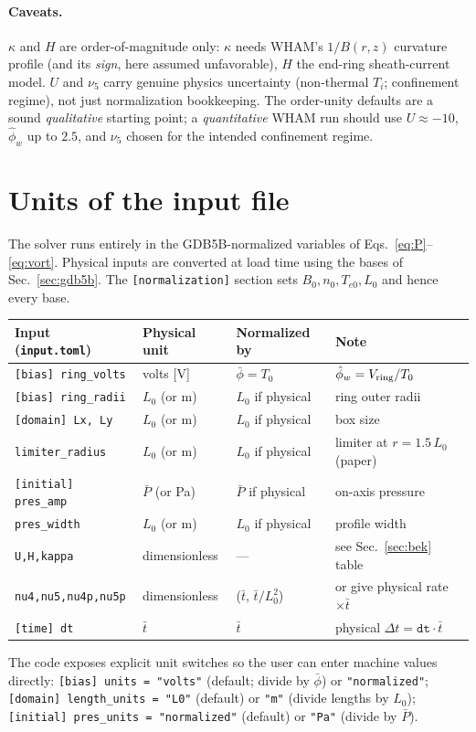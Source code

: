 \documentclass[11pt]{article}
\begin{document}
\paragraph{Caveats.} $\kappa$ and $H$ are order-of-magnitude only: $\kappa$ needs
WHAM's $1/B(r,z)$ curvature profile (and its \emph{sign}, here assumed unfavorable),
$H$ the end-ring sheath-current model. $U$ and $\nu_5$ carry genuine physics
uncertainty (non-thermal $T_i$; confinement regime), not just normalization
bookkeeping. The order-unity defaults are a sound \emph{qualitative} starting
point; a \emph{quantitative} WHAM run should use $U\approx-10$, $\hat\phi_w$ up to
$2.5$, and $\nu_5$ chosen for the intended confinement regime.

\section{Units of the input file}
\label{sec:units}

The solver runs entirely in the GDB5B-normalized variables of
Eqs.~\eqref{eq:P}--\eqref{eq:vort}. Physical inputs are converted at load time
using the bases of Sec.~\ref{sec:gdb5b}. The \texttt{[normalization]} section
sets $B_0,n_0,T_{e0},L_0$ and hence every base.
\begin{center}
\begin{tabular}{p{3.4cm} p{2.6cm} p{3.0cm} p{4.5cm}}
\toprule
Input (\texttt{input.toml}) & Physical unit & Normalized by & Note\\
\midrule
\texttt{[bias] ring\_volts}   & volts [\si{V}]        & $\bar\phi=T_0$        & $\hat\phi_w = V_{\rm ring}/T_0$\\
\texttt{[bias] ring\_radii}   & $L_0$ (or \si{m})     & $L_0$ if physical     & ring outer radii\\
\texttt{[domain] Lx, Ly}      & $L_0$ (or \si{m})     & $L_0$ if physical     & box size\\
\texttt{limiter\_radius}      & $L_0$ (or \si{m})     & $L_0$ if physical     & limiter at $r=1.5\,L_0$ (paper)\\
\texttt{[initial] pres\_amp}  & $\bar P$ (or \si{Pa}) & $\bar P$ if physical  & on-axis pressure\\
\texttt{pres\_width}          & $L_0$ (or \si{m})     & $L_0$ if physical     & profile width\\
\texttt{U,H,kappa}            & dimensionless         & ---                   & see Sec.~\ref{sec:bek} table\\
\texttt{nu4,nu5,nu4p,nu5p}    & dimensionless         & ($\bar t$, $\bar t/L_0^2$) & or give physical rate $\times\bar t$\\
\texttt{[time] dt}            & $\bar t$              & $\bar t$              & physical $\Delta t = \mathtt{dt}\cdot\bar t$\\
\bottomrule
\end{tabular}
\end{center}
The code exposes explicit unit switches so the user can enter machine values
directly:
\texttt{[bias] units = "volts"} (default; divide by $\bar\phi$) or
\texttt{"normalized"};
\texttt{[domain] length\_units = "L0"} (default) or \texttt{"m"} (divide lengths
by $L_0$);
\texttt{[initial] pres\_units = "normalized"} (default) or \texttt{"Pa"}
(divide by $\bar P$).
\end{document}
